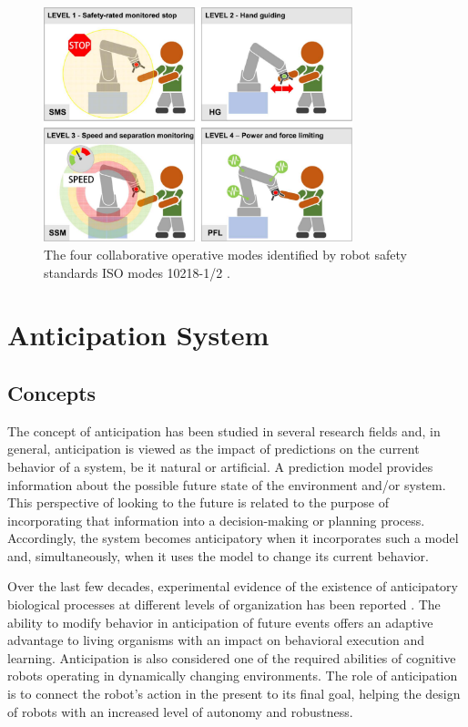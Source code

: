 \begin{figure}[ht]
\captionsetup{width=0.8\textwidth}
\centerline{\includegraphics[width=0.8\textwidth]{figs/iso.pdf}}
\caption[The four collaborative operative modes identified by robot safety standards ISO modes 10218-1/2.]{The four collaborative operative modes identified by robot safety standards ISO modes 10218-1/2 \cite{Villani2018}.}
\label{fig:isonorms}
\end{figure}

\section{Anticipation System}
\label{section:anticipation_system}

\subsection{Concepts}

The concept of anticipation has been studied in several research fields and, in general, anticipation is viewed as the impact of predictions on the current behavior of a system, be it natural or artificial. A prediction model provides information about the possible future state of the environment and/or system. This perspective of looking to the future is related to the purpose of incorporating that information into a decision-making or planning process. Accordingly, the system becomes anticipatory when it incorporates such a model and, simultaneously, when it uses the model to change its current behavior.

Over the last few decades, experimental evidence of the existence of anticipatory biological processes at different levels of organization has been reported \cite{Deans2021,Poli2010}. The ability to modify behavior in anticipation of future events offers an adaptive advantage to living organisms with an impact on behavioral execution and learning. Anticipation is also considered one of the required abilities of cognitive robots operating in dynamically changing environments. The role of anticipation is to connect the robot’s action in the present to its final goal, helping the design of robots with an increased level of autonomy and robustness.

